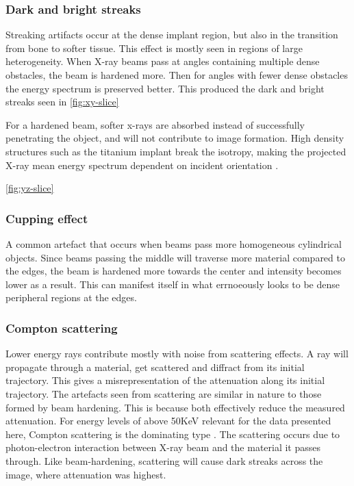 \subsubsection{Dark and bright streaks}

Streaking artifacts occur at the dense implant region, but also in the transition from bone to softer
tissue. This effect is mostly seen in regions of large heterogeneity. When X-ray beams pass at angles
containing multiple dense obstacles, the beam is hardened more. Then for angles with fewer dense
obstacles the energy spectrum is preserved better. This produced the dark and bright streaks seen in
\cref{fig:xy-slice}

For a hardened beam, softer x-rays are absorbed instead of successfully penetrating the object,
and will not contribute to image formation. High density structures such as the titanium implant
break the isotropy, making the projected X-ray mean energy spectrum dependent on incident orientation
\citep{srnoise}.

\cref{fig:yz-slice}

\subsubsection{Cupping effect}

A common artefact that occurs when beams pass more homogeneous cylindrical objects. Since beams
passing the middle will traverse more material compared to the edges, the beam is hardened more
towards the center and intensity becomes lower as a result. This can manifest itself in what
errnoeously looks to be dense peripheral regions at the edges.

\subsubsection{Compton scattering}

Lower energy rays contribute mostly with noise from scattering effects. A ray will propagate through a
material, get scattered and diffract from its initial trajectory. This gives a misrepresentation of
the attenuation along its initial trajectory. The artefacts seen from scattering are similar in
nature to those formed by beam hardening. This is because both effectively reduce the measured
attenuation. For energy levels of above 50KeV relevant for the data presented here, Compton
scattering is the dominating type \citep{compton}. The scattering occurs due to photon-electron
interaction between X-ray beam and the material it passes through. Like beam-hardening, scattering
will cause dark streaks across the image, where attenuation was highest.

